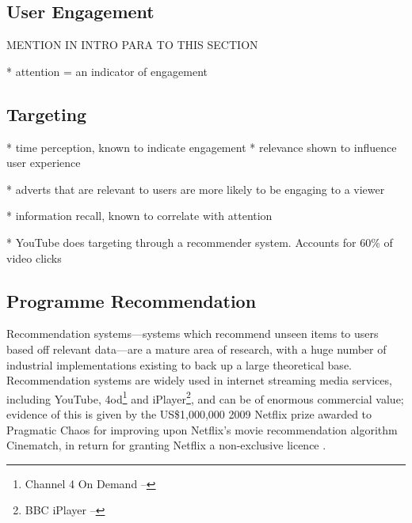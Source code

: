 \subsection{User Engagement}
	MENTION IN INTRO PARA TO THIS SECTION

	\cite{what_is_engagement}
	* attention = an indicator of engagement


\subsection{Targeting}

	\citet{yahoo-intrusive-advertising}
	* time perception, known to indicate engagement
	* relevance shown to influence user experience

	\citet{nettelhorst2012effects}
	* adverts that are relevant to users are more likely to be engaging to a viewer

	\citep{interactions_attention_memory}
	* information recall, known to correlate with attention

	\citep{davidson2012}
	* YouTube does targeting through a recommender system. Accounts for 60\% of video clicks


\subsection{Programme Recommendation}

	Recommendation systems---systems which recommend unseen items to users based off relevant data---are a mature area of research, with a huge number of industrial implementations existing to back up a large theoretical base. Recommendation systems are widely used in internet streaming media services, including YouTube, 4od\footnote{Channel 4 On Demand -- } and iPlayer\footnote{BBC iPlayer -- }, and can be of enormous commercial value; evidence of this is given by the US\$1,000,000 2009 Netflix prize awarded to Pragmatic Chaos for improving upon Netflix's movie recommendation algorithm Cinematch, in return for granting Netflix a non-exclusive licence \citep{pragmatic_chaos}.

